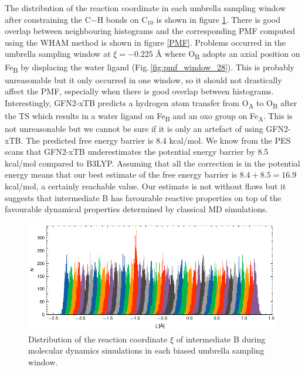 The distribution of the reaction coordinate in each umbrella sampling window after constraining the C$-$H bonds on C$_{10}$ is shown in figure \ref{fig:umbrella_histograms}. There is good overlap between neighbouring histograms and the corresponding PMF computed using the WHAM method is shown in figure \ref{PMF}. Problems occurred in the umbrella sampling window at $\xi = -0.225$ Å where O\textsubscript{B} adopts an axial position on Fe\textsubscript{B} by displacing the water ligand (Fig.\,\ref{fig:pmf_window_28}). This is probably unreasonable but it only occurred in one window, so it should not drastically affect the PMF, especially when there is good overlap between histograms. Interestingly, GFN2-xTB predicts a hydrogen atom transfer from O\textsubscript{A} to O\textsubscript{B} after the TS which results in a water ligand on Fe\textsubscript{B} and an oxo group on Fe\textsubscript{A}. This is not unreasonable but we cannot be sure if it is only an artefact of using GFN2-xTB. The predicted free energy barrier is 8.4 kcal/mol. We know from the PES scans that GFN2-xTB underestimates the potential energy barrier by 8.5 kcal/mol compared to B3LYP. Assuming that all the correction is in the potential energy means that our best estimate of the free energy barrier is $8.4 + 8.5 = 16.9$ kcal/mol, a certainly reachable value. Our estimate is not without flaws but it suggests that intermediate B has favourable reactive properties on top of the favourable dynamical properties determined by classical MD simulations.
\begin{figure}[ht]
    \centering
    \includegraphics[width=\textwidth]{Figures/umbrella_histograms.pdf}
    \caption{Distribution of the reaction coordinate $\xi$ of intermediate B during molecular dynamics simulations in each biased umbrella sampling window.}
    \label{fig:umbrella_histograms}
\end{figure}
